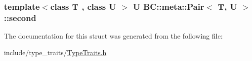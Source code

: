 \subsubsection[{\texorpdfstring{second}{second}}]{\setlength{\rightskip}{0pt plus 5cm}template$<$class T , class U $>$ U {\bf B\+C\+::meta\+::\+Pair}$<$ T, U $>$\+::second}\hypertarget{structBC_1_1meta_1_1Pair_a69948a251b84d1ca07b5167e0163fa0f}{}\label{structBC_1_1meta_1_1Pair_a69948a251b84d1ca07b5167e0163fa0f}


The documentation for this struct was generated from the following file\+:\begin{DoxyCompactItemize}
\item 
include/type\+\_\+traits/\hyperlink{TypeTraits_8h}{Type\+Traits.\+h}\end{DoxyCompactItemize}
